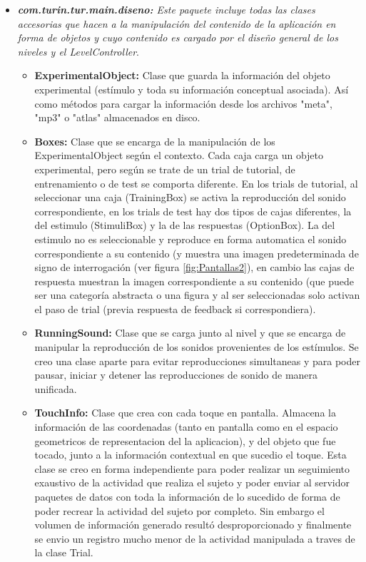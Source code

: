 \documentclass{article}
\numberwithin{figure}{section}
\begin{document}
\begin{itemize}
        \item \textit{\textbf{com.turin.tur.main.diseno:} Este paquete incluye todas las clases accesorias que hacen a la manipulación del contenido de la aplicación en forma de objetos y cuyo contenido es cargado por el diseño general de los niveles y el LevelController}.
        \begin{itemize}
            \item \textbf{ExperimentalObject:} Clase que guarda la información del objeto experimental (estímulo y toda su información conceptual asociada). Así como métodos para cargar la información desde los archivos "meta", "mp3" o "atlas" almacenados en disco. 
            \item \textbf{Boxes:} Clase que se encarga de la manipulación de los ExperimentalObject según el contexto. Cada caja carga un objeto experimental, pero según se trate de un trial de tutorial, de entrenamiento o de test se comporta diferente. En los trials de tutorial, al seleccionar una caja (TrainingBox) se activa la reproducción del sonido correspondiente, en los trials de test hay dos tipos de cajas diferentes, la del estimulo (StimuliBox) y la de las respuestas (OptionBox). La del estimulo no es seleccionable y reproduce en forma automatica el sonido correspondiente a su contenido (y muestra una imagen predeterminada de signo de interrogación (ver figura \ref{fig:Pantallas2}), en cambio las cajas de respuesta muestran la imagen correspondiente a su contenido (que puede ser una categoría abstracta o una figura y al ser seleccionadas solo activan el paso de trial (previa respuesta de feedback si correspondiera).  
            \item \textbf{RunningSound:} Clase que se carga junto al nivel y que se encarga de manipular la reproducción de los sonidos provenientes de los estímulos. Se creo una clase aparte para evitar reproducciones simultaneas y para poder pausar, iniciar y detener las reproducciones de sonido de manera unificada. 
            \item \textbf{TouchInfo:} Clase que crea con cada toque en pantalla. Almacena la información de las coordenadas (tanto en pantalla como en el espacio geometricos de representacion del la aplicacion), y del objeto que fue tocado, junto a la información contextual en que sucedio el toque. Esta clase se creo en forma independiente para poder realizar un seguimiento exaustivo de la actividad que realiza el sujeto y poder enviar al servidor paquetes de datos con toda la información de lo sucedido de forma de poder recrear la actividad del sujeto por completo. Sin embargo el volumen de información generado resultó desproporcionado y finalmente se envio un registro mucho menor de la actividad manipulada a traves de la clase Trial.

\end{itemize}
\end{itemize}
\end{document}
